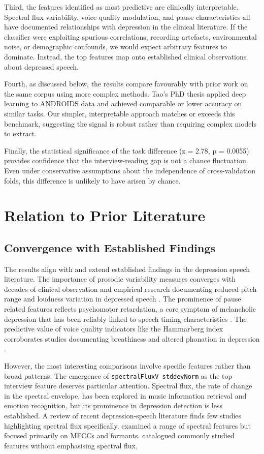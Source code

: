 Third, the features identified as most predictive are clinically interpretable. Spectral flux variability, voice quality modulation, and pause characteristics all have documented relationships with depression in the clinical literature. If the classifier were exploiting spurious correlations, recording artefacts, environmental noise, or demographic confounds, we would expect arbitrary features to dominate. Instead, the top features map onto established clinical observations about depressed speech.

Fourth, as discussed below, the results compare favourably with prior work on the same corpus using more complex methods. Tao's PhD thesis \cite{tao2020phd} applied deep learning to ANDROIDS data and achieved comparable or lower accuracy on similar tasks. Our simpler, interpretable approach matches or exceeds this benchmark, suggesting the signal is robust rather than requiring complex models to extract.

Finally, the statistical significance of the task difference (z = 2.78, p = 0.0055) provides confidence that the interview-reading gap is not a chance fluctuation. Even under conservative assumptions about the independence of cross-validation folds, this difference is unlikely to have arisen by chance.

\section{Relation to Prior Literature}

\subsection{Convergence with Established Findings}

The results align with and extend established findings in the depression speech literature. The importance of prosodic variability measures converges with decades of clinical observation and empirical research documenting reduced pitch range and loudness variation in depressed speech \cite{cummins2015review, low2011automated}. The prominence of pause related features reflects psychomotor retardation, a core symptom of melancholic depression that has been reliably linked to speech timing characteristics \cite{sobin1997psychomotor}. The predictive value of voice quality indicators like the Hammarberg index corroborates studies documenting breathiness and altered phonation in depression \cite{scherer1986vocal}.

However, the most interesting comparisons involve specific features rather than broad patterns. The emergence of \texttt{spectralFluxV\_\allowbreak{}stddevNorm} as the top interview feature deserves particular attention. Spectral flux, the rate of change in the spectral envelope, has been explored in music information retrieval and emotion recognition, but its prominence in depression detection is less established. A review of recent depression-speech literature finds few studies highlighting spectral flux specifically. \cite{alghowinem2013comparative} examined a range of spectral features but focused primarily on MFCCs and formants. \cite{cummins2015review} catalogued commonly studied features without emphasising spectral flux. 

